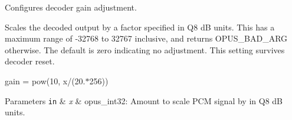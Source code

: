 Configures decoder gain adjustment. 

Scales the decoded output by a factor specified in Q8 dB units. This has a maximum range of -\/32768 to 32767 inclusive, and returns O\+P\+U\+S\+\_\+\+B\+A\+D\+\_\+\+A\+RG otherwise. The default is zero indicating no adjustment. This setting survives decoder reset.

gain = pow(10, x/(20.$\ast$256))


\begin{DoxyParams}[1]{Parameters}
\mbox{\tt in}  & {\em x} & {\ttfamily opus\+\_\+int32}\+: Amount to scale P\+CM signal by in Q8 dB units. \\
\hline
\end{DoxyParams}
